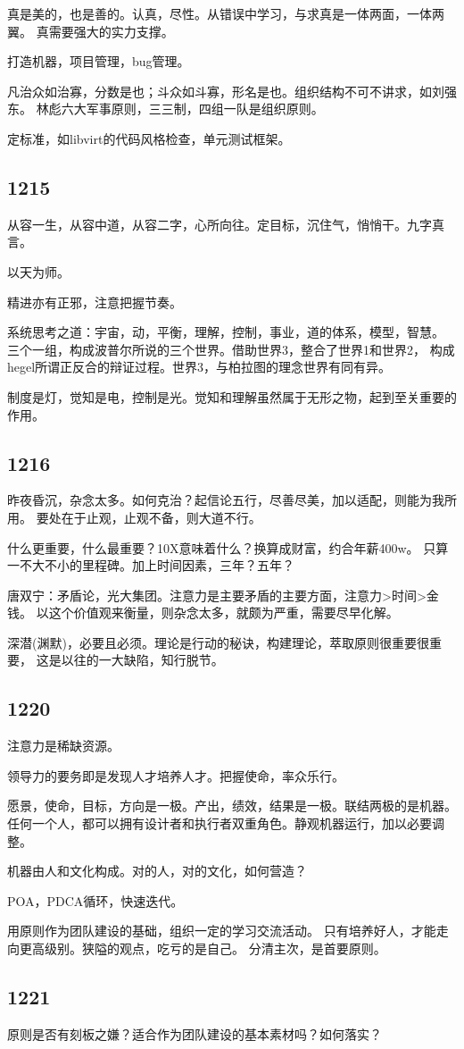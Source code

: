 真是美的，也是善的。认真，尽性。从错误中学习，与求真是一体两面，一体两翼。
真需要强大的实力支撑。

打造机器，项目管理，bug管理。

凡治众如治寡，分数是也；斗众如斗寡，形名是也。组织结构不可不讲求，如刘强东。
林彪六大军事原则，三三制，四组一队是组织原则。

定标准，如libvirt的代码风格检查，单元测试框架。

\subsection{1215}

从容一生，从容中道，从容二字，心所向往。定目标，沉住气，悄悄干。九字真言。

以天为师。

精进亦有正邪，注意把握节奏。

系统思考之道：宇宙，动，平衡，理解，控制，事业，道的体系，模型，智慧。
三个一组，构成波普尔所说的三个世界。借助世界3，整合了世界1和世界2，
构成hegel所谓正反合的辩证过程。世界3，与柏拉图的理念世界有同有异。

制度是灯，觉知是电，控制是光。觉知和理解虽然属于无形之物，起到至关重要的作用。

\subsection{1216}

昨夜昏沉，杂念太多。如何克治？起信论五行，尽善尽美，加以适配，则能为我所用。
要处在于止观，止观不备，则大道不行。

什么更重要，什么最重要？10X意味着什么？换算成财富，约合年薪400w。
只算一不大不小的里程碑。加上时间因素，三年？五年？

唐双宁：矛盾论，光大集团。注意力是主要矛盾的主要方面，注意力>时间>金钱。
以这个价值观来衡量，则杂念太多，就颇为严重，需要尽早化解。

深潜(渊默)，必要且必须。理论是行动的秘诀，构建理论，萃取原则很重要很重要，
这是以往的一大缺陷，知行脱节。

\subsection{1220}

注意力是稀缺资源。

领导力的要务即是发现人才培养人才。把握使命，率众乐行。

愿景，使命，目标，方向是一极。产出，绩效，结果是一极。联结两极的是机器。
任何一个人，都可以拥有设计者和执行者双重角色。静观机器运行，加以必要调整。

机器由人和文化构成。对的人，对的文化，如何营造？

POA，PDCA循环，快速迭代。

用原则作为团队建设的基础，组织一定的学习交流活动。
只有培养好人，才能走向更高级别。狭隘的观点，吃亏的是自己。
分清主次，是首要原则。

\subsection{1221}

原则是否有刻板之嫌？适合作为团队建设的基本素材吗？如何落实？
